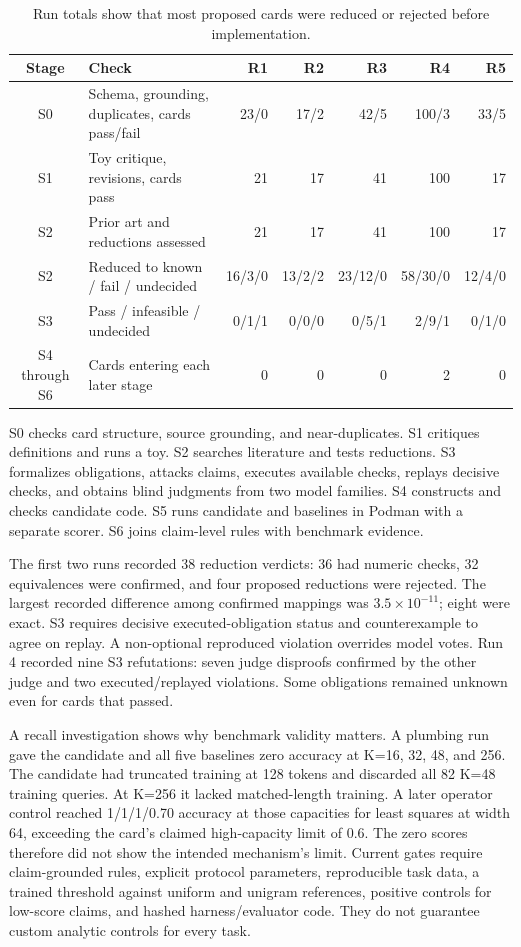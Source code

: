 \begin{table}[ht]
\centering\scriptsize
\caption{Run totals show that most proposed cards were reduced or rejected before implementation.}
\label{tab:gates}
\begin{tabular}{clrrrrr}
\toprule
Stage & Check & R1 & R2 & R3 & R4 & R5 \\
\midrule
S0 & Schema, grounding, duplicates, cards pass/fail & 23/0 & 17/2 & 42/5 & 100/3 & 33/5 \\
S1 & Toy critique, revisions, cards pass & 21 & 17 & 41 & 100 & 17 \\
S2 & Prior art and reductions assessed & 21 & 17 & 41 & 100 & 17 \\
S2 & Reduced to known / fail / undecided & 16/3/0 & 13/2/2 & 23/12/0 & 58/30/0 & 12/4/0 \\
S3 & Pass / infeasible / undecided & 0/1/1 & 0/0/0 & 0/5/1 & 2/9/1 & 0/1/0 \\
S4 through S6 & Cards entering each later stage & 0 & 0 & 0 & 2 & 0 \\
\bottomrule
\end{tabular}
\end{table}

S0 checks card structure, source grounding, and near-duplicates. S1 critiques definitions and runs a toy. S2 searches literature and tests reductions. S3 formalizes obligations, attacks claims, executes available checks, replays decisive checks, and obtains blind judgments from two model families. S4 constructs and checks candidate code. S5 runs candidate and baselines in Podman with a separate scorer. S6 joins claim-level rules with benchmark evidence.

The first two runs recorded 38 reduction verdicts: 36 had numeric checks, 32 equivalences were confirmed, and four proposed reductions were rejected. The largest recorded difference among confirmed mappings was $3.5\times10^{-11}$; eight were exact. S3 requires decisive executed-obligation status and counterexample to agree on replay. A non-optional reproduced violation overrides model votes. Run 4 recorded nine S3 refutations: seven judge disproofs confirmed by the other judge and two executed/replayed violations. Some obligations remained unknown even for cards that passed.

A recall investigation shows why benchmark validity matters. A plumbing run gave the candidate and all five baselines zero accuracy at K=16, 32, 48, and 256. The candidate had truncated training at 128 tokens and discarded all 82 K=48 training queries. At K=256 it lacked matched-length training. A later operator control reached 1/1/1/0.70 accuracy at those capacities for least squares at width 64, exceeding the card's claimed high-capacity limit of 0.6. The zero scores therefore did not show the intended mechanism's limit. Current gates require claim-grounded rules, explicit protocol parameters, reproducible task data, a trained threshold against uniform and unigram references, positive controls for low-score claims, and hashed harness/evaluator code. They do not guarantee custom analytic controls for every task.

